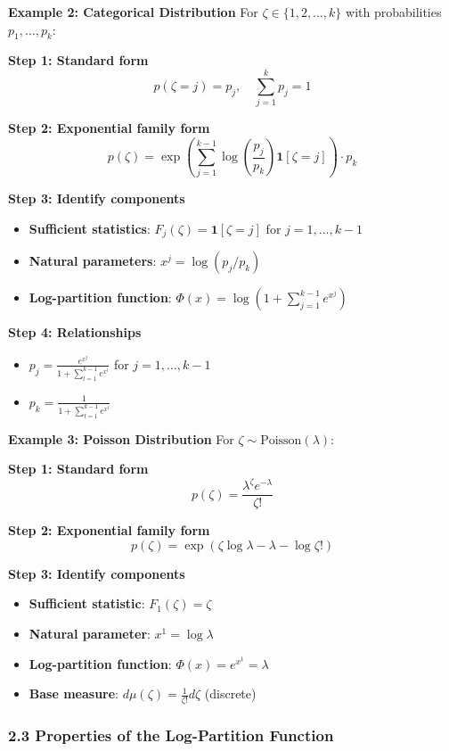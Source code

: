 \documentclass{amsart}
\theoremstyle{plain}
\theoremstyle{definition}
\theoremstyle{remark}
\begin{document}
\textbf{Example 2: Categorical Distribution}
For $\zeta \in \{1, 2, \ldots, k\}$ with probabilities $p_1, \ldots, p_k$:

\textbf{Step 1: Standard form}
\[
p(\zeta = j) = p_j, \quad \sum_{j=1}^k p_j = 1
\]

\textbf{Step 2: Exponential family form}
\[
p(\zeta) = \exp\left(\sum_{j=1}^{k-1} \log\left(\frac{p_j}{p_k}\right) \mathbf{1}[\zeta = j]\right) \cdot p_k
\]

\textbf{Step 3: Identify components}

\begin{itemize}
	\item \textbf{Sufficient statistics}: $F_j(\zeta) = \mathbf{1}[\zeta = j]$ for $j = 1, \ldots, k-1$
	\item \textbf{Natural parameters}: $x^j = \log(p_j/p_k)$
	\item \textbf{Log-partition function}: $\Phi(x) = \log\left(1 + \sum_{j=1}^{k-1} e^{x^j}\right)$
\end{itemize}

\textbf{Step 4: Relationships}

\begin{itemize}
	\item $p_j = \frac{e^{x^j}}{1 + \sum_{l=1}^{k-1} e^{x^l}}$ for $j = 1, \ldots, k-1$
	\item $p_k = \frac{1}{1 + \sum_{l=1}^{k-1} e^{x^l}}$
\end{itemize}

\textbf{Example 3: Poisson Distribution}
For $\zeta \sim \text{Poisson}(\lambda)$:

\textbf{Step 1: Standard form}
\[
p(\zeta) = \frac{\lambda^\zeta e^{-\lambda}}{\zeta!}
\]

\textbf{Step 2: Exponential family form}
\[
p(\zeta) = \exp(\zeta \log \lambda - \lambda - \log \zeta!)
\]

\textbf{Step 3: Identify components}

\begin{itemize}
	\item \textbf{Sufficient statistic}: $F_1(\zeta) = \zeta$
	\item \textbf{Natural parameter}: $x^1 = \log \lambda$
	\item \textbf{Log-partition function}: $\Phi(x) = e^{x^1} = \lambda$
	\item \textbf{Base measure}: $d\mu(\zeta) = \frac{1}{\zeta!} d\zeta$ (discrete)
\end{itemize}

\subsubsection{2.3 Properties of the Log-Partition Function}
\end{document}
